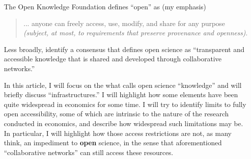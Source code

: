 \documentclass{article}
\begin{document}
\noindent The Open Knowledge Foundation \parencite[OKF]{open_knowledge_foundation_defining_2024} defines ``open'' as (my emphasis)

\begin{quote}

    ... anyone can freely access, use, modify, and share for any purpose \textit{(subject, at most, to requirements that preserve provenance and openness)}.
    
\end{quote}

\noindent Less broadly, \citet{vicente-saez_open_2018} identify a consensus that defines open science as ``transparent and accessible knowledge that is shared and developed through collaborative networks.''

In this article, I will focus on the what \cite{unesco_understanding_2022} calls open science ``knowledge'' and will briefly discuss ``infrastructures.'' I will highlight how some elements have been quite widespread in economics for some time. I will try to identify limits to fully open accessibility, some of which are intrinsic to the nature of the research conducted in economics, and describe how widespread such limitations may be. In particular, I will highlight how those access restrictions are not, as many think, an impediment to \textbf{open} science, in the sense that aforementioned ``collaborative networks'' can still access these resources. 
\end{document}
